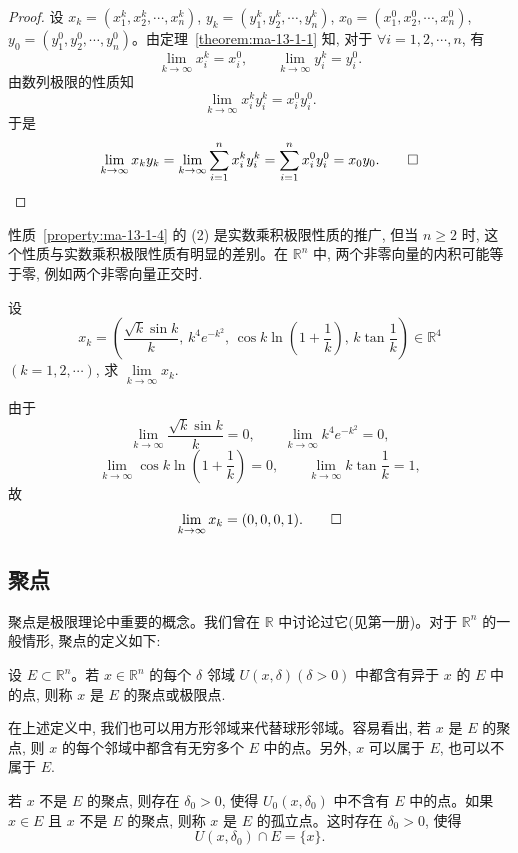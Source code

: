 \begin{proof}
设 $x_k=(x_1^k,x_2^k,\cdots,x_n^k)$, $y_k=(y_1^k,y_2^k,\cdots,y_n^k)$, $x_0=(x_1^0,x_2^0,\cdots,x_n^0)$, $y_0=(y_1^0,y_2^0,\cdots,y_n^0)$。由定理~\ref{theorem:ma-13-1-1} 知, 对于 $\forall i=1,2,\cdots,n$, 有
\[
  \lim_{k\to\infty}x_i^k=x_i^0,\qquad \lim_{k\to\infty}y_i^k=y_i^0.
\]
由数列极限的性质知
\[
  \lim_{k\to\infty}x_i^ky_i^k=x_i^0y_i^0.
\]
于是
\[
  \lim_{k\to\infty}x_ky_k
  =\lim_{k\to\infty}\sum_{i=1}^n x_i^ky_i^k
  =\sum_{i=1}^n x_i^0y_i^0=x_0y_0.
\qedhere
\]
\end{proof}


性质~\ref{property:ma-13-1-4} 的 (2) 是实数乘积极限性质的推广, 但当 $n\geqslant2$ 时, 这个性质与实数乘积极限性质有明显的差别。在 $\mathbb R^n$ 中, 两个非零向量的内积可能等于零, 例如两个非零向量正交时.

\begin{example}\label{example:ma-13-1-2}
设
\[
  x_k=\left(\frac{\sqrt k\sin k}{k},\,k^4e^{-k^2},\,\cos k\ln\left(1+\frac1k\right),\,k\tan\frac1k\right)\in\mathbb R^4
\]
$(k=1,2,\cdots)$, 求 $\lim\limits_{k\to\infty}x_k$.
\end{example}


\begin{solve}
由于
\[
  \lim_{k\to\infty}\frac{\sqrt k\sin k}{k}=0,\qquad
  \lim_{k\to\infty}k^4e^{-k^2}=0,
\]
\[
  \lim_{k\to\infty}\cos k\ln\left(1+\frac1k\right)=0,\qquad
  \lim_{k\to\infty}k\tan\frac1k=1,
\]
故
\[
  \lim_{k\to\infty}x_k=(0,0,0,1).
\qedhere
\]
\end{solve}


\subsection{聚点}
\label{subsec:ma-13-1-3}

聚点是极限理论中重要的概念。我们曾在 $\mathbb R$ 中讨论过它(见第一册)。对于 $\mathbb R^n$ 的一般情形, 聚点的定义如下:

\begin{definition}\label{definition:ma-13-1-4}
设 $E\subset\mathbb R^n$。若 $x\in\mathbb R^n$ 的每个 $\delta$ 邻域 $U(x,\delta)(\delta>0)$ 中都含有异于 $x$ 的 $E$ 中的点, 则称 $x$ 是 $E$ 的聚点或极限点.
\end{definition}

在上述定义中, 我们也可以用方形邻域来代替球形邻域。容易看出, 若 $x$ 是 $E$ 的聚点, 则 $x$ 的每个邻域中都含有无穷多个 $E$ 中的点。另外, $x$ 可以属于 $E$, 也可以不属于 $E$.

若 $x$ 不是 $E$ 的聚点, 则存在 $\delta_0>0$, 使得 $U_0(x,\delta_0)$ 中不含有 $E$ 中的点。如果 $x\in E$ 且 $x$ 不是 $E$ 的聚点, 则称 $x$ 是 $E$ 的孤立点。这时存在 $\delta_0>0$, 使得
\[
  U(x,\delta_0)\cap E=\{x\}.
\]

